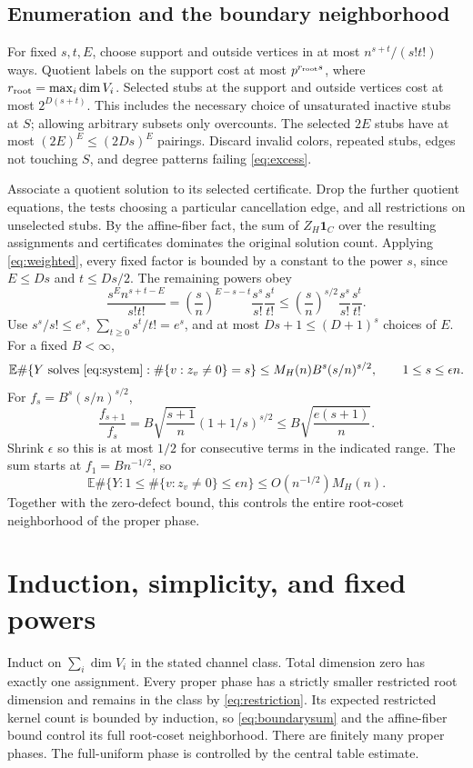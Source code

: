\documentclass[11pt]{article}
\newcommand{\E}{\mathbb E}
\newcommand{\one}{\mathbf 1}
\begin{document}
\subsection*{Enumeration and the boundary neighborhood}
For fixed $s,t,E$, choose support and outside vertices in at most $n^{s+t}/(s!t!)$ ways. Quotient labels on the support cost at most $p^{r_{\rm root}s}$, where $r_{\rm root}=\max_i\dim V_i$. Selected stubs at the support and outside vertices cost at most $2^{D(s+t)}$. This includes the necessary choice of unsaturated inactive stubs at $S$; allowing arbitrary subsets only overcounts. The selected $2E$ stubs have at most $(2E)^E\le(2Ds)^E$ pairings. Discard invalid colors, repeated stubs, edges not touching $S$, and degree patterns failing \eqref{eq:excess}.

Associate a quotient solution to its selected certificate. Drop the further quotient equations, the tests choosing a particular cancellation edge, and all restrictions on unselected stubs. By the affine-fiber fact, the sum of $Z_H\one_C$ over the resulting assignments and certificates dominates the original solution count. Applying \eqref{eq:weighted}, every fixed factor is bounded by a constant to the power $s$, since $E\le Ds$ and $t\le Ds/2$. The remaining powers obey
\begin{equation}\label{eq:powers}
 \frac{s^E n^{s+t-E}}{s!t!}
 =\left(\frac{s}{n}\right)^{E-s-t}\frac{s^s}{s!}\frac{s^t}{t!}
 \le\left(\frac{s}{n}\right)^{s/2}\frac{s^s}{s!}\frac{s^t}{t!}.
\end{equation}
Use $s^s/s!\le e^s$, $\sum_{t\ge0}s^t/t!=e^s$, and at most $Ds+1\le(D+1)^s$ choices of $E$. For a fixed $B<\infty$,
\begin{equation}\label{eq:boundary}
 \E\#\{Y\text{ solves \eqref{eq:system}}:\#\{v:z_v\ne0\}=s\}
 \le M_H(n)B^s(s/n)^{s/2},\qquad1\le s\le\epsilon n.
\end{equation}
For $f_s=B^s(s/n)^{s/2}$,
\[
 \frac{f_{s+1}}{f_s}
 =B\sqrt{\frac{s+1}{n}}(1+1/s)^{s/2}
 \le B\sqrt{\frac{e(s+1)}n}.
\]
Shrink $\epsilon$ so this is at most $1/2$ for consecutive terms in the indicated range. The sum starts at $f_1=B n^{-1/2}$, so
\begin{equation}\label{eq:boundarysum}
 \E\#\{Y:1\le\#\{v:z_v\ne0\}\le\epsilon n\}
 \le O(n^{-1/2})M_H(n).
\end{equation}
Together with the zero-defect bound, this controls the entire root-coset neighborhood of the proper phase.

\section{Induction, simplicity, and fixed powers}
Induct on $\sum_i\dim V_i$ in the stated channel class. Total dimension zero has exactly one assignment. Every proper phase has a strictly smaller restricted root dimension and remains in the class by \eqref{eq:restriction}. Its expected restricted kernel count is bounded by induction, so \eqref{eq:boundarysum} and the affine-fiber bound control its full root-coset neighborhood. There are finitely many proper phases. The full-uniform phase is controlled by the central table estimate.
\end{document}
